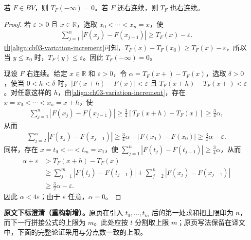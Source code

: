 \documentclass[../../main.tex]{subfiles}%
\begin{document}
\begin{lemma}\label{lemma:ch03-variation-right-continuity}
若 $F\in BV$，则 $T_F(-\infty)=0$。若 $F$ 还右连续，则 $T_F$ 也右连续。
\end{lemma}
\begin{proof}
若 $\varepsilon>0$ 且 $x\in\mathbb R$，选取 $x_0<\cdots<x_n=x$，使
\begin{align*}
\sum_{j=1}^n|F(x_j)-F(x_{j-1})|\ge T_F(x)-\varepsilon.
\end{align*}
由\cref{align:ch03-variation-increment}可知，$T_F(x)-T_F(x_0)\ge T_F(x)-\varepsilon$，所以当 $y\le x_0$ 时，$T_F(y)\le\varepsilon$。因此 $T_F(-\infty)=0$。

现设 $F$ 右连续。给定 $x\in\mathbb R$ 和 $\varepsilon>0$，令 $\alpha=T_F(x+)-T_F(x)$，选取 $\delta>0$，使当 $0<h<\delta$ 时，$|F(x+h)-F(x)|<\varepsilon$ 且 $T_F(x+h)-T_F(x+)<\varepsilon$。对任意这样的 $h$，由\cref{align:ch03-variation-increment}，存在 $x=x_0<\cdots<x_n=x+h$，使
\begin{align*}
\sum_{j=1}^n|F(x_j)-F(x_{j-1})|
\ge\tfrac34[T_F(x+h)-T_F(x)]\ge\tfrac34\alpha,
\end{align*}
从而
\begin{align*}
\sum_{j=2}^n|F(x_j)-F(x_{j-1})|
\ge\tfrac34\alpha-|F(x_1)-F(x_0)|\ge\tfrac34\alpha-\varepsilon.
\end{align*}
同样，存在 $x=t_0<\cdots<t_m=x_1$，使 $\sum_{j=1}^n|F(t_j)-F(t_{j-1})|\ge\tfrac34\alpha$，从而
\begin{align*}
\alpha+\varepsilon
&>T_F(x+h)-T_F(x)\\
&\ge\sum_{j=1}^m|F(t_j)-F(t_{j-1})|+\sum_{j=2}^n|F(x_j)-F(x_{j-1})|\\
&\ge\tfrac32\alpha-\varepsilon.
\end{align*}
因此 $\alpha<4\varepsilon$；由于 $\varepsilon$ 任意，$\alpha=0$。
\end{proof}
\begin{remark}
\textbf{原文下标澄清（重构新增）。}原页在引入 $t_0,\ldots,t_m$ 后的第一处求和把上限印为 $n$，而下一行拼接公式的上限为 $m$。此处应按 $t$ 分割取上限 $m$；原页写法保留在译文中，下面的完整论证采用与分点数一致的上限。
\end{remark}
\end{document}
